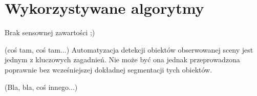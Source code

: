 \chapter{Wykorzystywane algorytmy}
\label{ch:algorytmy}

Brak sensownej zawartości ;)


(coś tam, coś tam...) Automatyzacja detekcji obiektów obserwowanej sceny jest jednym z kluczowych zagadnień. Nie może być ona jednak przeprowadzona poprawnie bez wcześniejszej dokładnej segmentacji tych obiektów.

(Bla, bla, coś innego...)



